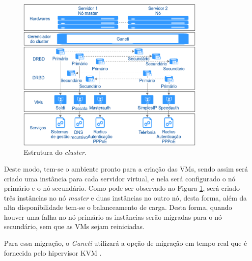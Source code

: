 \begin{figure}[h!]
 \centering
 \includegraphics[width=350px]{img/projeto_estrutura.eps}
 \caption{Estrutura do \textit{cluster}.}
 \label{fig:projeto_estrutura}
\end{figure}


Deste modo, tem-se o ambiente pronto para a criação das \acp{VM}, sendo assim será criado uma instância para cada servidor virtual, e nela será
configurado o nó primário e o nó secundário. Como pode ser observado no Figura \ref{fig:projeto_estrutura}, será criado três instâncias no nó
\textit{master} e duas instâncias no outro nó, desta forma, além da alta disponibilidade tem-se o balanceamento de carga.
Desta forma, quando houver uma falha no nó primário as instâncias serão migradas para o nó secundário, sem que as \acp{VM} sejam reiniciadas.

Para essa migração, o \textit{Ganeti} utilizará a opção de migração em tempo real que é fornecida pelo hipervisor \ac{KVM} \cite{kvm}. 
% 

